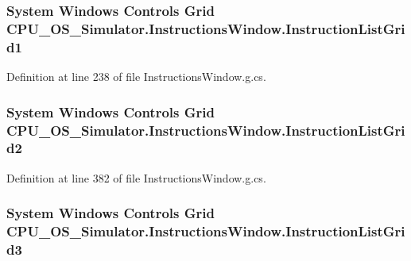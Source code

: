 \subsubsection[{Instruction\+List\+Grid1}]{\setlength{\rightskip}{0pt plus 5cm}System Windows Controls Grid C\+P\+U\+\_\+\+O\+S\+\_\+\+Simulator.\+Instructions\+Window.\+Instruction\+List\+Grid1\hspace{0.3cm}{\ttfamily [package]}}\label{class_c_p_u___o_s___simulator_1_1_instructions_window_a8f09b0005016c225169d7e9dd2724053}


Definition at line 238 of file Instructions\+Window.\+g.\+cs.

\hypertarget{class_c_p_u___o_s___simulator_1_1_instructions_window_a33108da9779c5108fc5dd303a8d33454}{}
\subsubsection[{Instruction\+List\+Grid2}]{\setlength{\rightskip}{0pt plus 5cm}System Windows Controls Grid C\+P\+U\+\_\+\+O\+S\+\_\+\+Simulator.\+Instructions\+Window.\+Instruction\+List\+Grid2\hspace{0.3cm}{\ttfamily [package]}}\label{class_c_p_u___o_s___simulator_1_1_instructions_window_a33108da9779c5108fc5dd303a8d33454}


Definition at line 382 of file Instructions\+Window.\+g.\+cs.

\hypertarget{class_c_p_u___o_s___simulator_1_1_instructions_window_a3cc76cf3ae5c4155d0e30727eb357d12}{}
\subsubsection[{Instruction\+List\+Grid3}]{\setlength{\rightskip}{0pt plus 5cm}System Windows Controls Grid C\+P\+U\+\_\+\+O\+S\+\_\+\+Simulator.\+Instructions\+Window.\+Instruction\+List\+Grid3\hspace{0.3cm}{\ttfamily [package]}}\label{class_c_p_u___o_s___simulator_1_1_instructions_window_a3cc76cf3ae5c4155d0e30727eb357d12}


